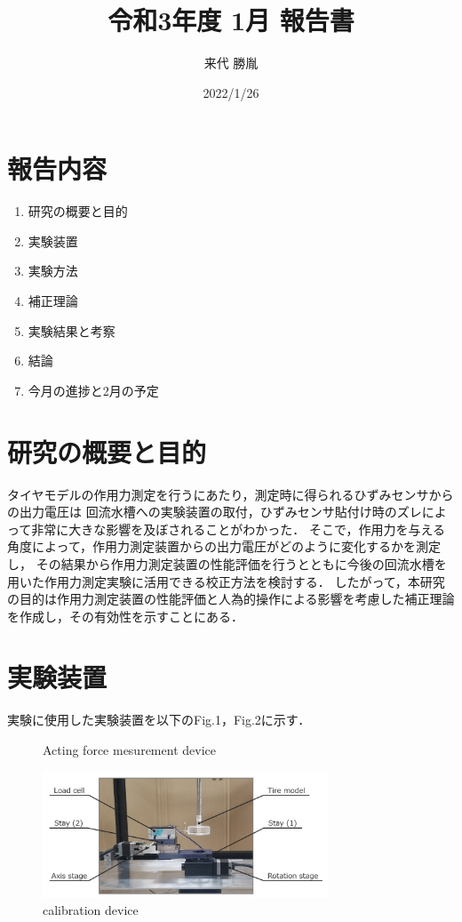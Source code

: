\documentclass[twocolumn,a4j]{jsarticle}
\author{来代 勝胤}
\title{令和3年度 1月 報告書}
\date{2022/1/26}
\begin{document}
\columnseprule=0.1mm

\maketitle
\section*{報告内容}
\begin{enumerate}[1.]
    \item 研究の概要と目的
    \item 実験装置
    \item 実験方法
    \item 補正理論
    \item 実験結果と考察
    \item 結論
    \item 今月の進捗と2月の予定
\end{enumerate}

\section{研究の概要と目的}
タイヤモデルの作用力測定を行うにあたり，測定時に得られるひずみセンサからの出力電圧は
回流水槽への実験装置の取付，ひずみセンサ貼付け時のズレによって非常に大きな影響を及ぼされることがわかった．
そこで，作用力を与える角度によって，作用力測定装置からの出力電圧がどのように変化するかを測定し，
その結果から作用力測定装置の性能評価を行うとともに今後の回流水槽を用いた作用力測定実験に活用できる校正方法を検討する．
したがって，本研究の目的は作用力測定装置の性能評価と人為的操作による影響を考慮した補正理論を作成し，その有効性を示すことにある．

\section{実験装置}
実験に使用した実験装置を以下のFig.1，Fig.2に示す．
\begin{figure}[htbp]
    \begin{center}
        \caption{Acting force mesurement device}
        \includegraphics[width=85mm]{../images/21-2.png}
        \caption{calibration device}
    \end{center}
\end{figure}
\end{document}
